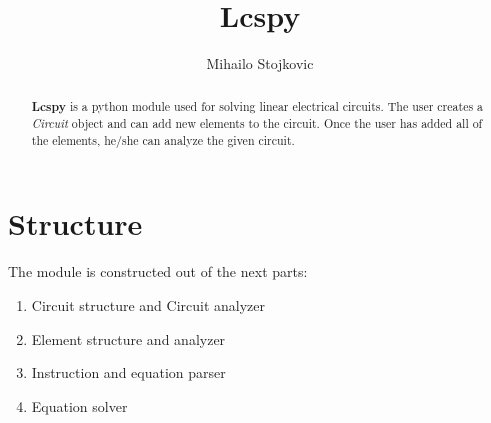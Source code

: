 \documentclass{article}
\title{Lcspy}
\author{Mihailo Stojkovic}
\date{}
\begin{document}
\maketitle
\begin{abstract}
    \textbf{Lcspy} is a python module used for solving linear electrical circuits. The user creates a \textit{Circuit} object and can add new elements to the circuit. Once the user has added all of the elements, he/she can analyze the given circuit.
\end{abstract}

\section{Structure}
    The module is constructed out of the next parts:
    \begin{enumerate}
        \item Circuit structure and Circuit analyzer
        \item Element structure and analyzer
        \item Instruction and equation parser
        \item Equation solver
    \end{enumerate}
\end{document}
